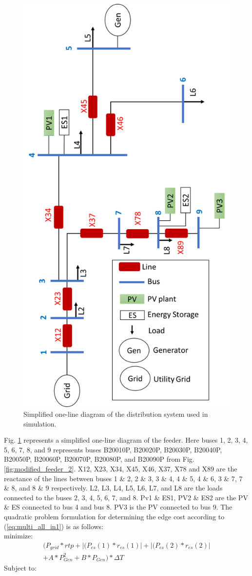 \begin{figure}[!ht]
\centering
\includegraphics[width = .5\linewidth, angle = 270]{figs/A82/Grid_setup.png}
\caption{Simplified one-line diagram of the distribution system used in simulation.}
\label{fig:one_line}
\end{figure}

Fig. \ref{fig:one_line} represents a simplified one-line diagram of the feeder. Here buses 1, 2, 3, 4, 5, 6, 7, 8, and 9 represents buses B20010P, B20020P, B20030P, B20040P, B20050P, B20060P, B20070P, B20080P, and B20090P from Fig. \ref{fig:modified_feeder_2}. X12, X23, X34, X45, X46, X37, X78 and X89 are the reactance of the lines between buses 1 \& 2, 2 \& 3, 3 \& 4, 4 \& 5, 4 \& 6, 3 \& 7, 7 \& 8, and 8 \& 9 respectively. L2, L3, L4, L5, L6, L7, and L8 are the loads connected to the buses 2, 3, 4, 5, 6, 7, and 8. Pv1 \& ES1, PV2 \& ES2 are the PV \& ES connected to bus 4 and bus 8. PV3 is the PV connected to bus 9. The quadratic problem formulation for determining the edge cost according to (\ref{eq:multi_all_in1}) is as follows:\\
minimize:
\begin{multline}
\label{eq:multi_all_in1_sys}
    ( P_{grid}*rtp + |(P_{es}(1)*r_{es}(1)| + |(P_{es}(2)*r_{es}(2)| \\ + A*P_{Gen}^2 + B*P_{Gen} )*\Delta T
\end{multline}
Subject to:\\

